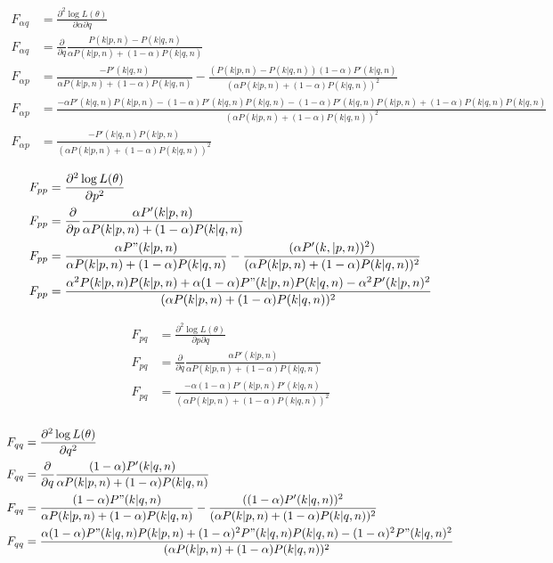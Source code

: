 \begin{align*}
F_{\alpha q} &= \frac{\partial^2\log L(\mathbb{\theta})}{\partial\alpha\partial q} \\
F_{\alpha q} &= \frac{\partial}{\partial q}\frac{P(k | p, n) - P(k | q, n)}{\alpha P(k | p, n) + (1-\alpha)P(k | q, n)} \\
F_{\alpha p} &= \frac{-P'(k | q, n)}{\alpha P(k | p, n) + (1-\alpha)P(k | q, n)} - \frac{(P(k | p, n) - P(k | q, n))(1 - \alpha)P'(k | q, n)}{(\alpha P(k | p, n) + (1 - \alpha) P(k | q, n))^2} \\
F_{\alpha p} &= \frac{-\alpha P'(k | q, n)P(k | p, n) - (1 - \alpha)P'(k | q, n)P(k | q, n) - (1 - \alpha)P'(k | q, n)P(k | p, n) + (1 - \alpha)P(k | q, n)P(k | q, n)}{(\alpha P(k | p, n) + (1 - \alpha) P(k | q, n))^2} \\
F_{\alpha p} &= \frac{-P'(k | q, n)P(k | p, n)}{(\alpha P(k | p, n) + (1 - \alpha) P(k | q, n))^2}
\end{align*}

\begin{align*}
F_{pp} &= \frac{\partial^2\log L(\mathbb{\theta})}{\partial p^2} \\
F_{pp} &= \frac{\partial}{\partial p}\frac{\alpha P'(k | p, n)}{\alpha P(k | p, n) + (1-\alpha)P(k | q, n)} \\ 
F_{pp} &= \frac{\alpha P"(k | p, n)}{\alpha P(k | p, n) + (1-\alpha)P(k | q, n)} - \frac{(\alpha P'(k, | p, n))^2)}{(\alpha P(k | p, n) + (1 - \alpha) P(k | q, n))^2} \\
F_{pp} &= \frac{\alpha^2P(k | p, n)P(k | p, n) + \alpha(1 - \alpha)P"(k | p, n)P(k | q, n) - \alpha^2P'(k | p, n)^2}{(\alpha P(k | p, n) + (1 - \alpha) P(k | q, n))^2} \\
\end{align*}

\begin{align*}
F_{pq} &= \frac{\partial^2\log L(\mathbb{\theta})}{\partial p\partial q} \\
F_{pq} &= \frac{\partial}{\partial q}\frac{\alpha P'(k | p, n)}{\alpha P(k | p, n) + (1-\alpha)P(k | q, n)} \\ 
F_{pq} &= \frac{-\alpha(1 - \alpha)P'(k | p, n)P'(k | q, n)}{(\alpha P(k | p, n) + (1 - \alpha) P(k | q, n))^2} \\
\end{align*}

\begin{align*}
F_{qq} &= \frac{\partial^2\log L(\mathbb{\theta})}{\partial q^2} \\
F_{qq} &= \frac{\partial}{\partial q}\frac{(1 - \alpha) P'(k | q, n)}{\alpha P(k | p, n) + (1-\alpha)P(k | q, n)} \\
F_{qq} &= \frac{(1 - \alpha) P"(k | q, n)}{\alpha P(k | p, n) + (1-\alpha)P(k | q, n)} - \frac{((1 - \alpha)P'(k | q, n))^2}{(\alpha P(k | p, n) + (1 - \alpha) P(k | q, n))^2} \\
F_{qq} &= \frac{\alpha(1 - \alpha)P"(k | q, n)P(k | p, n) + (1 - \alpha)^2P"(k | q, n)P(k | q, n) - (1 - \alpha)^2P"(k | q, n)^2}{(\alpha P(k | p, n) + (1 - \alpha) P(k | q, n))^2}
\end{align*}

